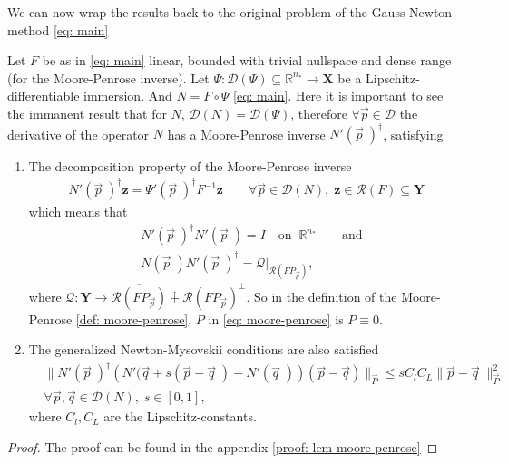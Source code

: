 We can now wrap the results back to the original problem of the Gauss-Newton
method \ref{eq: main}
\begin{lemma}
    \label{lem: moore-penrose}
    Let $F$ be as in \ref{eq: main} linear, bounded with trivial nullspace
    and dense range (for the Moore-Penrose inverse). Let $\Psi:
    \mathcal{D}(\Psi)\subseteq \mathbb{R}^{n_*} \to \mathbf{X}$ be a
    Lipschitz-differentiable immersion. And $N = F\circ \Psi$ \ref{eq: main}.
    Here it is important to see the immanent result that for $N$,
    $\mathcal{D}(N) = \mathcal{D}(\Psi)$, therefore $\forall \vec{p} \in
    \mathcal{D}$ the derivative of the operator $N$ has a Moore-Penrose
    inverse $N'(\vec{p}\;)^{\dagger}$, satisfying
    \begin{enumerate}
        \item The decomposition property of the Moore-Penrose inverse
            \begin{align}
                N'(\vec{p}\;)^{\dagger}\mathbf{z} =
                \Psi'(\vec{p}\;)^{\dagger}F^{-1}\mathbf{z} \qquad \forall
                \vec{p} \in \mathcal{D}(N),\; \mathbf{z} \in \mathcal{R}(F)
                \subseteq \mathbf{Y}
            \end{align}
            which means that
            \begin{align}
                &N'(\vec{p}\;)^{\dagger}N'(\vec{p}\;) = I \quad \text{on} \;\;
                \mathbb{R}^{n_*} \qquad \text{and}\\
                &N(\vec{p}\;)N'(\vec{p}\;)^{\dagger} =
                \mathcal{Q}|_{\mathcal{R}(FP_{\vec{p}})},
            \end{align}
            where $\mathcal{Q} : \mathbf{Y} \to
            \overline{\mathcal{R}(FP_{\vec{p}})}\dotplus\mathcal{R}(FP_{\vec{p}})^{\perp}$.
            So in the definition of the Moore-Penrose
            \ref{def: moore-penrose},
            $P$ in \ref{eq: moore-penrose} is $P \equiv 0$.
        \item The generalized Newton-Mysovskii conditions are also satisfied
            \begin{align}
                &\big\| N'(\vec{p}\;)^{\dagger}\left( N'(\vec{q} + s(\vec{p} -
                \vec{q}\;) - N'(\vec{q}\;)\right) (\vec{p} - \vec{q})
                \big\|_{\vec{P}}
                \leq s C_l C_L \|\vec{p} - \vec{q} \;\|^{2}_{\vec{P}}\\
                & \forall \vec{p}, \vec{q} \in \mathcal{D}(N), \; s \in[0,
                1],
            \end{align}
            where $C_l, C_L$ are the Lipschitz-constants.
    \end{enumerate}
\end{lemma}
\begin{proof}
    The proof can be found in the appendix \ref{proof: lem-moore-penrose}
\end{proof}

